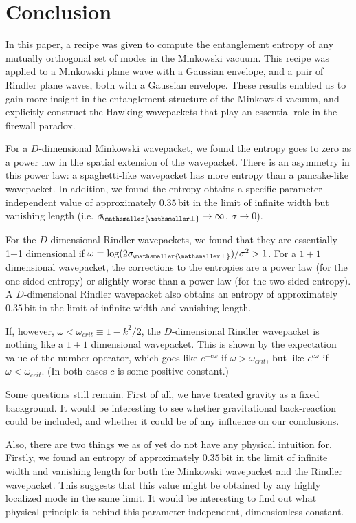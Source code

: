 \documentclass[11pt, a4paper]{article}
\newcommand{\om}{\omega}
\newcommand{\si}{{\sigma}}
\let\perptmp\perp
\renewcommand{\perp}{{\! \mathsmaller{\perptmp}}}
\begin{document}
\section{Conclusion}
\label{sec:conclusion}
In this paper, a recipe was given to compute the entanglement entropy of any mutually orthogonal set of modes in the Minkowski vacuum. This recipe was applied to a Minkowski plane wave with a Gaussian envelope, and a pair of Rindler plane waves, both with a Gaussian envelope. These results enabled us to gain more insight in the entanglement structure of the Minkowski vacuum, and explicitly construct the Hawking wavepackets that play an essential role in the firewall paradox. 

For a $D$-dimensional Minkowski wavepacket, we found the entropy goes to zero as a power law in the spatial extension of the wavepacket. There is an asymmetry in this power law: a spaghetti-like wavepacket has more entropy than a pancake-like wavepacket. In addition, we found the entropy obtains a specific parameter-independent value of approximately $0.35\,$bit in the limit of infinite width but vanishing length (i.e. $\si_\perp\to\infty$, $\si\to 0$). 

For the $D$-dimensional Rindler wavepackets, we found that they are essentially 1+1 dimensional if $\om\equiv \log(2\si_\perp)/\si^2>1$. For a $1+1$ dimensional wavepacket, the corrections to the entropies are a power law (for the one-sided entropy) or slightly worse than a power law (for the two-sided entropy). A $D$-dimensional Rindler wavepacket also obtains an entropy of approximately $0.35\,$bit in the limit of infinite width and vanishing length. 

If, however, $\om<\om_{crit}\equiv 1-k^2/2$, the $D$-dimensional Rindler wavepacket is nothing like a $1+1$ dimensional wavepacket. This is shown by the expectation value of the number operator, which goes like $e^{-c \om}$ if $\om>\om_{crit}$, but like $e^{c \om}$ if $\om<\om_{crit}$. (In both cases $c$ is some positive constant.) 

Some questions still remain. 
First of all, we have treated gravity as a fixed background. It would be interesting to see whether gravitational back-reaction could be included, and whether it could be of any influence on our conclusions. 

Also, there are two things we as of yet do not have any physical intuition for. Firstly, we found an entropy of approximately $0.35\,$bit in the limit of infinite width and vanishing length for both the Minkowski wavepacket and the Rindler wavepacket. This suggests that this value might be obtained by any highly localized mode in the same limit. It would be interesting to find out what physical principle is behind this parameter-independent, dimensionless constant. 
\end{document}
